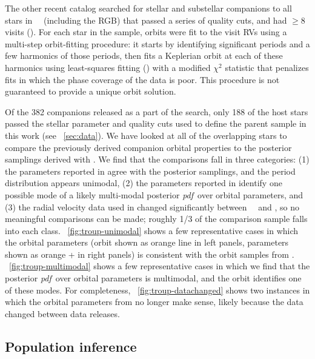 \documentclass[modern, letterpaper]{aastex62}
\newcommand{\apogee}{\project{\acronym{APOGEE}}}
\newcommand{\thejoker}{\project{The~Joker}}
\newcommand{\DR}{\acronym{DR14}}
\newcommand{\DRtw}{\acronym{DR12}}
\newcommand{\pdf}{\textit{pdf}}
\begin{document}
The other recent catalog searched for stellar and substellar companions to all
stars in \apogee\ \DRtw\ (including the RGB) that passed a series of quality
cuts, and had $\geq 8$ visits (\citealt{Troup:2016}).
For each star in the sample, orbits were fit to the visit RVs using a multi-step
orbit-fitting procedure: it starts by identifying significant periods and a few
harmonics of those periods, then fits a Keplerian orbit at each of these
harmonics using least-squares fitting (\citealt{De-Lee:2013}) with a modified
$\chi^2$ statistic that penalizes fits in which the phase coverage of the data
is poor.
This procedure is not guaranteed to provide a unique orbit solution.

Of the 382 companions released as a part of the \citet{Troup:2016} search, only
188 of the host stars passed the stellar parameter and quality cuts used to
define the parent sample in this work (see \sectionname~\ref{sec:data}).
We have looked at all of the overlapping stars to compare the previously derived
companion orbital properties to the posterior samplings derived with \thejoker.
We find that the comparisons fall in three categories:
(1) the parameters reported in \citet{Troup:2016} agree with the posterior
samplings, and the period distribution appears unimodal,
(2) the parameters reported in \citet{Troup:2016} identify one possible mode of
a likely multi-modal posterior \pdf\ over orbital parameters, and
(3) the radial velocity data used in \citet{Troup:2016} changed significantly
between \apogee\ \DRtw\ and \DR, so no meaningful comparisons can be made;
roughly 1/3 of the comparison sample falls into each class.
\figurename~\ref{fig:troup-unimodal} shows a few representative cases in which
the \citet{Troup:2016} orbital parameters (orbit shown as orange line in left
panels, parameters shown as orange + in right panels) is consistent with the
orbit samples from \thejoker.
\figurename~\ref{fig:troup-multimodal} shows a few representative cases in which
we find that the posterior \pdf\ over orbital parameters is multimodal, and the
\citet{Troup:2016} orbit identifies one of these modes.
For completeness, \figurename~\ref{fig:troup-datachanged} shows two instances in
which the orbital parameters from \citet{Troup:2016} no longer make sense,
likely because the data changed between data releases.

\subsection{Population inference}
\end{document}
